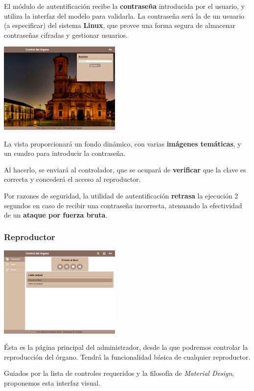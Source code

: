 \documentclass[10pt,a4paper]{article}
\begin{document}
	El módulo de autentificación recibe la \textbf{contraseña} introducida por el usuario, y utiliza la interfaz del modelo para validarla. La contraseña será la de un usuario (a especificar) del sistema \textbf{Linux}, que provee una forma segura de almacenar contraseñas cifradas y gestionar usuarios.
	
	\begin{multicols}{2}
		\noindent
		\begin{center}
			\includegraphics[width=0.45\textwidth]{images/cap_portada} 
		\end{center}
		\columnbreak
		La vista proporcionará un fondo dinámico, con varias \textbf{imágenes temáticas}, y un cuadro para introducir la contraseña. 
		
		Al hacerlo, se enviará al controlador, que se ocupará de \textbf{verificar} que la clave es correcta y concederá el acceso al reproductor.
	\end{multicols}
	
	Por razones de seguridad, la utilidad de autentificación \textbf{retrasa} la ejecución 2 segundos en caso de recibir una contraseña incorrecta, atenuando la efectividad de un \textbf{ataque por fuerza bruta}.
	
	\subsubsection*{Reproductor}
	
	\begin{multicols}{2}
		\noindent
		\begin{center}
			\includegraphics[width=0.45\textwidth]{images/cap_reproductor} 
		\end{center}
		\columnbreak
		Ésta es la página principal del administrador, desde la que podremos controlar la reproducción del órgano. Tendrá la funcionalidad básica de cualquier reproductor.
		
		Guiados por la lista de controles requeridos y la filosofía de \textit{Material Design}, proponemos esta interfaz visual.
	\end{multicols}
	
\end{document}
